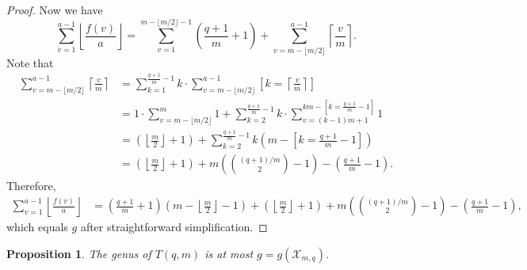 \documentclass[12pt]{amsart}
\newtheorem{proposition}[theorem]{Proposition}
\theoremstyle{remark}
\theoremstyle{definition}
\begin{document}
\begin{proof}
    \vspace{0.3cm}
    Now we have
    \[
        \sum_{v=1}^{a-1} \left\lfloor\frac{f(v)}{a}\right\rfloor
        = \sum_{v=1}^{m-\lfloor m/2\rfloor-1}
          \left(\frac{q+1}{m}+1\right)
        + \sum_{v=m-\lfloor m/2\rfloor}^{a-1}
          \left\lceil\frac{v}{m}\right\rceil.
    \]
    Note that
    \begin{align*}
        \sum_{v=m-\lfloor m/2\rfloor}^{a-1}
        \left\lceil\frac{v}{m}\right\rceil
        &= \sum_{k=1}^{\frac{q+1}{m}-1} k \cdot
           \sum_{v=m-\lfloor m/2\rfloor}^{a-1}
           \left[k = \left\lceil\tfrac{v}{m}\right\rceil\right] \\
        &= 1 \cdot \sum_{v=m-\lfloor m/2\rfloor}^{m} 1
           + \sum_{k=2}^{\frac{q+1}{m}-1} k \cdot
             \sum_{v=(k-1)m+1}^{km - [k=\frac{q+1}{m}-1]} 1 \\
        &= \left(\left\lfloor\tfrac{m}{2}\right\rfloor+1\right)
           + \sum_{k=2}^{\frac{q+1}{m}-1}
             k\!\left(m - \left[k=\tfrac{q+1}{m}-1\right]\right) \\
        &= \left(\left\lfloor\tfrac{m}{2}\right\rfloor+1\right)
           + m\!\left(\binom{(q+1)/m}{2}-1\right)
           - \left(\tfrac{q+1}{m}-1\right).
    \end{align*}
    Therefore,
    {\small
    \begin{align*}
        \sum_{v=1}^{a-1}\left\lfloor\frac{f(v)}{a}\right\rfloor
        &= \left(\frac{q+1}{m}+1\right)
           \left(m-\left\lfloor\tfrac{m}{2}\right\rfloor-1\right)
         + \left(\left\lfloor\tfrac{m}{2}\right\rfloor+1\right)
         + m\!\left(\binom{(q+1)/m}{2}-1\right)
         - \left(\tfrac{q+1}{m}-1\right),
    \end{align*}
    }
    which equals $g$ after straightforward simplification.
\end{proof}

\begin{proposition}\label{genus-Pinf}
    The genus of $T(q,m)$ is at most $g = g(\mathcal{X}_{m,q})$.
\end{proposition}
\end{document}
